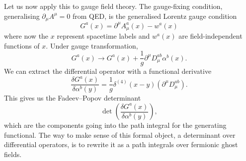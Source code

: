Let us now apply this to gauge field theory. The gauge-fixing condition, generalising $\partial_{\mu} A^{\mu} = 0$ from QED, is the generalised Lorentz gauge condition
\begin{equation}
  G^{a}(x) = \partial^{\mu} A^{a}_{\mu}(x) - w^{a}(x)
\end{equation}
where now the $x$ represent spacetime labels and $w^{a}(x)$ are field-independent functions of $x$.
Under gauge transformation,
\begin{equation}
  G^{a}(x) \to G^{a}(x) + \frac{1}{g} \partial^{\mu} D^{ab}_{\mu} \alpha^{b}(x).
\end{equation}
We can extract the differential operator with a functional derivative
\begin{equation}
  \frac{\delta G^{a}(x)}{\delta \alpha^{b}(y)} = \frac{1}{g} \delta^{(4)}(x - y) (\partial^{\mu} D_{\mu}^{ab}).
\end{equation}
This gives us the Fadeev--Popov determinant
\begin{equation}
  \det( \frac{\delta G^{a}(x)}{\delta \alpha^{b}(y)} ),
\end{equation}
which are the components going into the path integral for the generating functional.
The way to make sense of this formal object, a determinant over differential operators, is to rewrite it as a path integrals over fermionic ghost fields.
